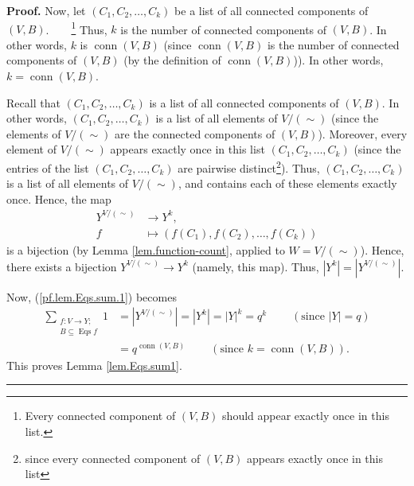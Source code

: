 \documentclass[numbers=enddot,12pt,final,onecolumn,notitlepage]{scrartcl}%
\theoremstyle{definition}
\newenvironment{proof}[1][Proof]{\noindent\textbf{#1.} }{\ \rule{0.5em}{0.5em}}
\newenvironment{verlong}{}{}
\let\sumnonlimits\sum
\renewcommand{\sum}{\sumnonlimits\limits}
\begin{document}
\begin{verlong}
\begin{proof}
Now, let $\left(  C_{1},C_{2},\ldots,C_{k}\right)  $ be a list of all
connected components of $\left(  V,B\right)  $.\ \ \ \ \footnote{Every
connected component of $\left(  V,B\right)  $ should appear exactly once in
this list.} Thus, $k$ is the number of connected components of $\left(
V,B\right)  $. In other words, $k$ is $\operatorname*{conn}\left(  V,B\right)
$ (since $\operatorname*{conn}\left(  V,B\right)  $ is the number of connected
components of $\left(  V,B\right)  $ (by the definition of
$\operatorname*{conn}\left(  V,B\right)  $)). In other words,
$k=\operatorname*{conn}\left(  V,B\right)  $.

Recall that $\left(  C_{1},C_{2},\ldots,C_{k}\right)  $ is a list of all
connected components of $\left(  V,B\right)  $. In other words, $\left(
C_{1},C_{2},\ldots,C_{k}\right)  $ is a list of all elements of $V/\left(
\sim\right)  $ (since the elements of $V/\left(  \sim\right)  $ are the
connected components of $\left(  V,B\right)  $). Moreover, every element of
$V/\left(  \sim\right)  $ appears exactly once in this list $\left(
C_{1},C_{2},\ldots,C_{k}\right)  $ (since the entries of the list $\left(
C_{1},C_{2},\ldots,C_{k}\right)  $ are pairwise distinct\footnote{since every
connected component of $\left(  V,B\right)  $ appears exactly once in this
list}). Thus, $\left(  C_{1},C_{2},\ldots,C_{k}\right)  $ is a list of all
elements of $V/\left(  \sim\right)  $, and contains each of these elements
exactly once. Hence, the map%
\begin{align*}
Y^{V/\left(  \sim\right)  }  &  \rightarrow Y^{k},\\
f  &  \mapsto\left(  f\left(  C_{1}\right)  ,f\left(  C_{2}\right)
,\ldots,f\left(  C_{k}\right)  \right)
\end{align*}
is a bijection (by Lemma \ref{lem.function-count}, applied to $W=V/\left(
\sim\right)  $). Hence, there exists a bijection $Y^{V/\left(  \sim\right)
}\rightarrow Y^{k}$ (namely, this map). Thus, $\left\vert Y^{k}\right\vert
=\left\vert Y^{V/\left(  \sim\right)  }\right\vert $.

Now, (\ref{pf.lem.Eqs.sum.1}) becomes%
\begin{align*}
\sum_{\substack{f:V\rightarrow Y;\\B\subseteq\operatorname*{Eqs}f}}1  &
=\left\vert Y^{V/\left(  \sim\right)  }\right\vert =\left\vert Y^{k}%
\right\vert =\left\vert Y\right\vert ^{k}=q^{k}\ \ \ \ \ \ \ \ \ \ \left(
\text{since }\left\vert Y\right\vert =q\right) \\
&  =q^{\operatorname*{conn}\left(  V,B\right)  }\ \ \ \ \ \ \ \ \ \ \left(
\text{since }k=\operatorname*{conn}\left(  V,B\right)  \right)  .
\end{align*}
This proves Lemma \ref{lem.Eqs.sum1}.
\end{proof}
\end{verlong}
\end{document}
